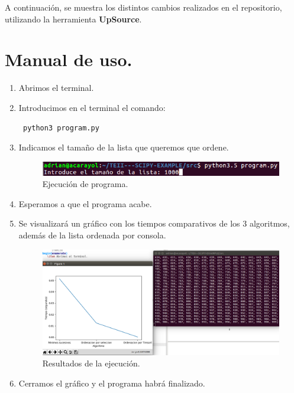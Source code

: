 \documentclass[a4,12pt]{article}
\begin{document}
	A continuación, se muestra los distintos cambios realizados en el repositorio, utilizando la herramienta \textbf{UpSource}.
		
	\section{Manual de uso.}
	
	
	\begin{enumerate}
		\item Abrimos el terminal.
		
		\item Introducimos en el terminal el comando:
			\subitem \begin{verbatim} python3 program.py \end{verbatim}
		\item Indicamos el tamaño de la lista que queremos que ordene.
		\begin{figure}[t]
			\begin{center}
				\includegraphics[scale=0.5]{pic1.png}
				\caption{Ejecución de programa.}
			\end{center}
		\end{figure}
		\FloatBarrier
		\item Esperamos a que el programa acabe.
		\item Se visualizará un gráfico con los tiempos comparativos de los 3 algoritmos, además de la lista ordenada por consola.
		\begin{figure}[t]
			\begin{center}
				\includegraphics[scale=0.5]{pic2.png}
				\caption{Resultados de la ejecución.}
			\end{center}
		\end{figure}
		\FloatBarrier
		\item Cerramos el gráfico y el programa habrá finalizado.
	\end{enumerate}
	
\end{document}
